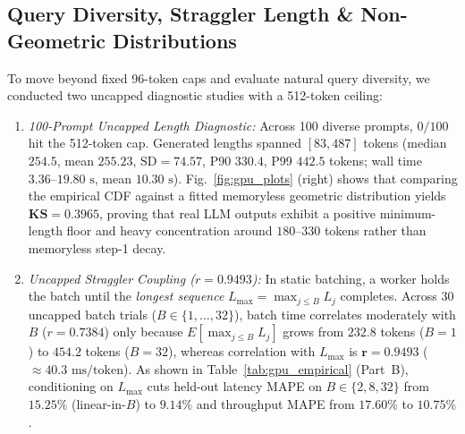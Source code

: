\documentclass[conference]{IEEEtran}
\begin{document}
\subsection{Query Diversity, Straggler Length \& Non-Geometric Distributions}
To move beyond fixed 96-token caps and evaluate natural query diversity, we conducted two uncapped diagnostic studies with a 512-token ceiling:
\begin{enumerate}\setlength{\itemsep}{0pt}\setlength{\topsep}{1pt}
  \item \emph{100-Prompt Uncapped Length Diagnostic:} Across 100 diverse prompts, $0/100$ hit the 512-token cap. Generated lengths spanned $[83, 487]$ tokens (median $254.5$, mean $255.23$, $\text{SD}{=}74.57$, P90 $330.4$, P99 $442.5$ tokens; wall time $3.36\text{--}19.80\text{ s}$, mean $10.30\text{ s}$). Fig.~\ref{fig:gpu_plots} (right) shows that comparing the empirical CDF against a fitted memoryless geometric distribution yields $\mathbf{KS = 0.3965}$, proving that real LLM outputs exhibit a positive minimum-length floor and heavy concentration around $180\text{--}330$ tokens rather than memoryless step-1 decay.
  \item \emph{Uncapped Straggler Coupling ($r{=}0.9493$):} In static batching, a worker holds the batch until the \emph{longest sequence} $L_{\max} = \max_{j \le B} L_j$ completes. Across 30 uncapped batch trials ($B \in \{1,\dots,32\}$), batch time correlates moderately with $B$ ($r{=}0.7384$) only because $E[\max_{j \le B} L_j]$ grows from $232.8$ tokens ($B{=}1$) to $454.2$ tokens ($B{=}32$), whereas correlation with $L_{\max}$ is $\mathbf{r = 0.9493}$ ($\approx 40.3\text{ ms/token}$). As shown in Table~\ref{tab:gpu_empirical} (Part~B), conditioning on $L_{\max}$ cuts held-out latency MAPE on $B \in \{2, 8, 32\}$ from $\mathbf{15.25\%}$ (linear-in-$B$) to $\mathbf{9.14\%}$ and throughput MAPE from $\mathbf{17.60\%}$ to $\mathbf{10.75\%}$.
\end{enumerate}
\end{document}
